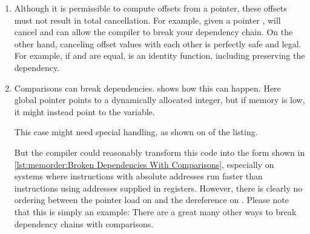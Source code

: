 \begin{enumerate}
\item	Although it is permissible to compute offsets from a
	pointer, these offsets must not result in total cancellation.
	For example, given a  pointer ,
	 will cancel and can allow the compiler
	to break your dependency chain.
	On the other hand, canceling offset values with each other
	is perfectly safe and legal.
	For example, if  and  are equal, 
	is an identity function, including preserving the dependency.
\item	Comparisons can break dependencies.
	shows how this can happen.
	Here global pointer  points to a dynamically allocated
	integer, but if memory is low, it might instead point to
	the  variable.
	\begin{fcvref}
	This  case might need special handling, as
	shown on  of the listing.
	\end{fcvref}
	\begin{fcvref}
	But the compiler could reasonably transform this code into
	the form shown in
	\cref{lst:memorder:Broken Dependencies With Comparisons},
	especially on systems where instructions with absolute
	addresses run faster than instructions using addresses
	supplied in registers.
	However, there is clearly no ordering between the pointer
	load on  and the dereference on .
	Please note that this is simply an example:
	There are a great many other ways to break dependency chains
	with comparisons.
	\end{fcvref}
\end{enumerate}


